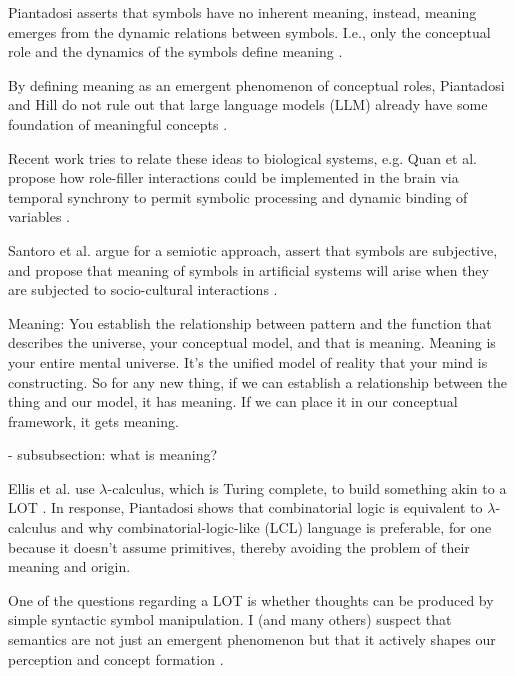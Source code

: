 Piantadosi asserts that symbols have no inherent meaning, instead, meaning emerges from the dynamic relations between symbols. I.e., only the conceptual role and the dynamics of the symbols define meaning \cite{piantadosi2021computational}.

By defining meaning as an emergent phenomenon of conceptual roles, Piantadosi and Hill do not rule out that large language models (LLM) already have some foundation of meaningful concepts \cite{piantasodi2022meaning}.

Recent work tries to relate these ideas to biological systems, e.g. Quan et al. propose how role-filler interactions could be implemented in the brain via temporal synchrony to permit symbolic processing and dynamic binding of variables \cite{do2021neural}.

Santoro et al. argue for a semiotic approach, assert that symbols are subjective, and propose that meaning of symbols in artificial systems will arise when they are subjected to socio-cultural interactions \cite{santoro2021symbolic}.





Meaning: You establish the relationship between pattern and the function that describes the universe, your conceptual model, and that is meaning. Meaning is your entire mental universe. It's the unified model of reality that your mind is constructing. So for any new thing, if we can establish a relationship between the thing and our model, it has meaning. If we can place it in our conceptual framework, it gets meaning. 

- subsubsection: what is meaning?






Ellis et al. use $\lambda$-calculus, which is Turing complete, to build something akin to a LOT \cite{ellis_dreamcoder_2021}. In response, Piantadosi shows that combinatorial logic is equivalent to $\lambda$-calculus and why combinatorial-logic-like (LCL) language is preferable, for one because it doesn't assume primitives, thereby avoiding the problem of their meaning and origin.

One of the questions regarding a LOT is whether thoughts can be produced by simple syntactic symbol manipulation.
I (and many others) suspect that semantics are not just an emergent phenomenon but that it actively shapes our perception and concept formation \cite{santoro2021symbolic, hofstadter_gdel_1979}.

